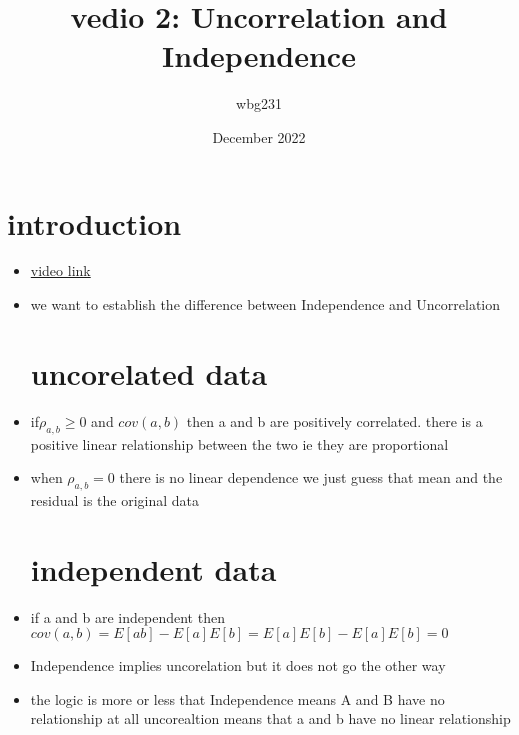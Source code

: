 \documentclass{article}
\title{vedio 2: Uncorrelation and Independence}
\author{wbg231 }
\date{December 2022}
\begin{document}
\maketitle

\section{introduction}
\begin{itemize}
\item \href{https://www.youtube.com/watch?v=t9TNCYYK8ck&list=PLBEf5mJtE6KuZ5NBQMuWIMsiOOrV9ibzm&index=62}{video link}
\item we want to establish the difference between Independence and Uncorrelation 
\section{uncorelated data}
\item if$\rho_{a,b}\geq 0$ and $cov(a,b)$ then a and b are positively correlated. there is a positive linear relationship between the two ie they are proportional
\item when $\rho_{a,b}=0$ there is no linear dependence we just guess that mean and the residual is the original data
\section{independent data}
\item if a and b are independent then $cov(a,b)=E[ab]-E[a]E[b]=E[a]E[b]-E[a]E[b]=0$
\item Independence implies uncorelation but it does not go the other way 
\item the logic is more or less that Independence means A and B have no relationship at all uncorealtion means that a and b have no linear relationship

\end{itemize}
\end{document}
